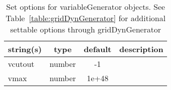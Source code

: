 \begin{table}[ht]
\centering
\begin{tabular}{p{5cm} c c p{7cm}}
\hline
string(s) & type & default & description \\
\hline
vcutout & number & -1 & \\
vmax & number & 1e+48 & \\
\hline
\end{tabular}
\caption{Set options for variableGenerator objects. See Table~\ref{table:gridDynGenerator} for additional settable options through gridDynGenerator}
\label{table:variableGenerator}
\end{table}

